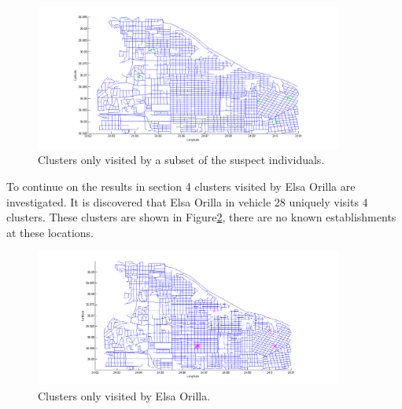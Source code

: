 \begin{figure}[H]
\centering
\includegraphics[width=0.9\textwidth]{Watch_Clusters.png}
\caption{\label{fig:Watch_Clusters}Clusters only visited by a subset of the suspect individuals.}
\end{figure}

\noindent To continue on the results in section 4 clusters visited by Elsa Orilla are investigated. It is discovered that Elsa Orilla in vehicle 28 uniquely visits 4 clusters.  These clusters are shown in Figure\ref{fig:ID28_Clusters}, there are no known establishments at these locations. 

\begin{figure}[H]
\centering
\includegraphics[width=0.9\textwidth]{ID28_Clusters.png}
\caption{\label{fig:ID28_Clusters}Clusters only visited by Elsa Orilla.}
\end{figure}


